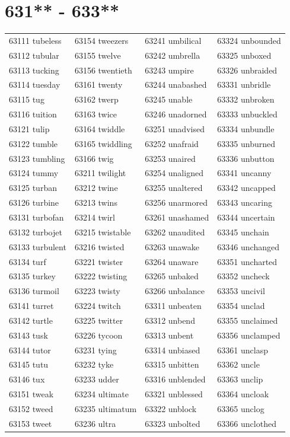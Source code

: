 \documentclass[10pt, oneside]{book}
\begin{document}
\begin{table}
	\centering
	\section*{631** - 633**}
	\begin{tabular}{l l l l}
63111 tubeless &63154 tweezers &63241 umbilical &63324 unbounded\\
63112 tubular &63155 twelve &63242 umbrella &63325 unboxed\\
63113 tucking &63156 twentieth &63243 umpire &63326 unbraided\\
63114 tuesday &63161 twenty &63244 unabashed &63331 unbridle\\
63115 tug &63162 twerp &63245 unable &63332 unbroken\\
63116 tuition &63163 twice &63246 unadorned &63333 unbuckled\\
63121 tulip &63164 twiddle &63251 unadvised &63334 unbundle\\
63122 tumble &63165 twiddling &63252 unafraid &63335 unburned\\
63123 tumbling &63166 twig &63253 unaired &63336 unbutton\\
63124 tummy &63211 twilight &63254 unaligned &63341 uncanny\\
63125 turban &63212 twine &63255 unaltered &63342 uncapped\\
63126 turbine &63213 twins &63256 unarmored &63343 uncaring\\
63131 turbofan &63214 twirl &63261 unashamed &63344 uncertain\\
63132 turbojet &63215 twistable &63262 unaudited &63345 unchain\\
63133 turbulent &63216 twisted &63263 unawake &63346 unchanged\\
63134 turf &63221 twister &63264 unaware &63351 uncharted\\
63135 turkey &63222 twisting &63265 unbaked &63352 uncheck\\
63136 turmoil &63223 twisty &63266 unbalance &63353 uncivil\\
63141 turret &63224 twitch &63311 unbeaten &63354 unclad\\
63142 turtle &63225 twitter &63312 unbend &63355 unclaimed\\
63143 tusk &63226 tycoon &63313 unbent &63356 unclamped\\
63144 tutor &63231 tying &63314 unbiased &63361 unclasp\\
63145 tutu &63232 tyke &63315 unbitten &63362 uncle\\
63146 tux &63233 udder &63316 unblended &63363 unclip\\
63151 tweak &63234 ultimate &63321 unblessed &63364 uncloak\\
63152 tweed &63235 ultimatum &63322 unblock &63365 unclog\\
63153 tweet &63236 ultra &63323 unbolted &63366 unclothed\\
	\end{tabular}
 \end{table}
\clearpage
\end{document}
